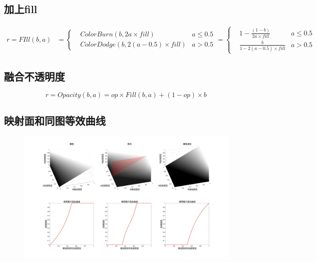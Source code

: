 \subsection{ 加上fill}

\begin{equation}
	\begin{aligned}r=FIll(b,a)&=\left\{ \begin{aligned}&ColorBurn(b,2a\times fill)&a\leq 0.5\\&ColorDodge(b,2(a-0.5)\times fill)&a> 0.5 \end{aligned}\right.=\left\{ \begin{aligned}&1-\frac{(1-b)}{2a\times fill}&a\leq 0.5\\&\frac{b}{1-2(a-0.5)\times fill}&a>0.5\end{aligned}\right.\end{aligned}
	\end{equation}

\subsection{ 融合不透明度}

\begin{equation}r=Opacity(b,a)=op\times Fill(b,a)+(1-op)\times b\end{equation}

\subsection{ 映射面和同图等效曲线}

\begin{figure}[h!]
	\centering
	\includegraphics[width=\linewidth]{figure/亮光}
	\caption{}
	\label{fig:}
\end{figure}



